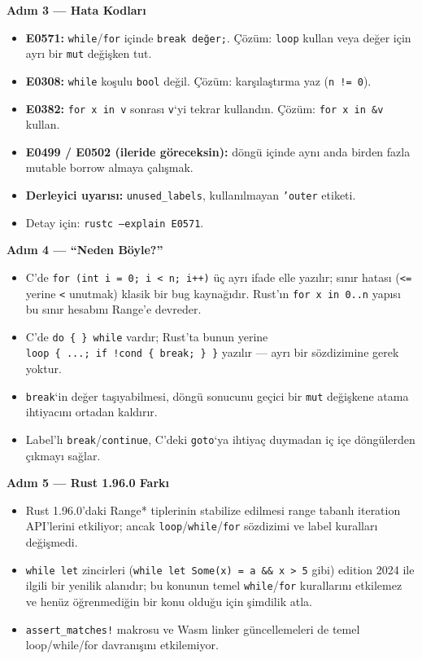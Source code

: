 \documentclass[12pt,a4paper]{article}
\begin{document}
\textbf{Adım 3 --- Hata Kodları}

\begin{itemize}
\tightlist
\item
  \textbf{E0571:} \texttt{while}/\texttt{for} içinde \texttt{break\ değer;}. Çözüm: \texttt{loop} kullan veya değer için ayrı bir \texttt{mut} değişken tut.
\item
  \textbf{E0308:} \texttt{while} koşulu \texttt{bool} değil. Çözüm: karşılaştırma yaz (\texttt{n\ !=\ 0}).
\item
  \textbf{E0382:} \texttt{for\ x\ in\ v} sonrası \texttt{v}`yi tekrar kullandın. Çözüm: \texttt{for\ x\ in\ \&v} kullan.
\item
  \textbf{E0499 / E0502 (ileride göreceksin):} döngü içinde aynı anda birden fazla mutable borrow almaya çalışmak.
\item
  \textbf{Derleyici uyarısı:} \texttt{unused\_labels}, kullanılmayan \texttt{'outer} etiketi.
\item
  Detay için: \texttt{rustc\ --explain\ E0571}.
\end{itemize}

\textbf{Adım 4 --- ``Neden Böyle?''}

\begin{itemize}
\tightlist
\item
  C'de \texttt{for\ (int\ i\ =\ 0;\ i\ \textless{}\ n;\ i++)} üç ayrı ifade elle yazılır; sınır hatası (\texttt{\textless{}=} yerine \texttt{\textless{}} unutmak) klasik bir bug kaynağıdır. Rust'ın \texttt{for\ x\ in\ 0..n} yapısı bu sınır hesabını Range'e devreder.
\item
  C'de \texttt{do\ \{\ \}\ while} vardır; Rust'ta bunun yerine \texttt{loop\ \{\ ...;\ if\ !cond\ \{\ break;\ \}\ \}} yazılır --- ayrı bir sözdizimine gerek yoktur.
\item
  \texttt{break}`in değer taşıyabilmesi, döngü sonucunu geçici bir \texttt{mut} değişkene atama ihtiyacını ortadan kaldırır.
\item
  Label'lı \texttt{break}/\texttt{continue}, C'deki \texttt{goto}`ya ihtiyaç duymadan iç içe döngülerden çıkmayı sağlar.
\end{itemize}

\textbf{Adım 5 --- Rust 1.96.0 Farkı}

\begin{itemize}
\tightlist
\item
  Rust 1.96.0'daki Range* tiplerinin stabilize edilmesi range tabanlı iteration API'lerini etkiliyor; ancak \texttt{loop}/\texttt{while}/\texttt{for} sözdizimi ve label kuralları değişmedi.
\item
  \texttt{while\ let} zincirleri (\texttt{while\ let\ Some(x)\ =\ a\ \&\&\ x\ \textgreater{}\ 5} gibi) edition 2024 ile ilgili bir yenilik alanıdır; bu konunun temel \texttt{while}/\texttt{for} kurallarını etkilemez ve henüz öğrenmediğin bir konu olduğu için şimdilik atla.
\item
  \texttt{assert\_matches!} makrosu ve Wasm linker güncellemeleri de temel loop/while/for davranışını etkilemiyor.
\end{itemize}
\end{document}

